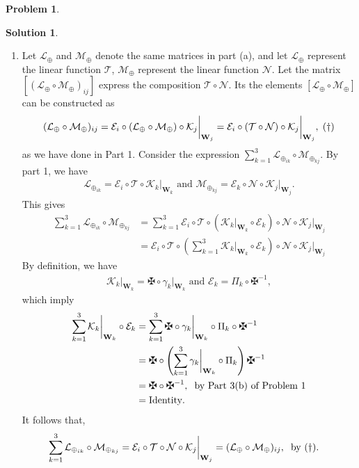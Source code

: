 \documentclass{article}
\theoremstyle{definition}
\newtheorem*{prob*}{Problem}
\newtheorem*{sln*}{Solution}
\newcommand{\W}{\mathbf{W}}
\newcommand{\lag}{\mathcal{L}}
\newcommand{\M}{\mathcal{M}}
\newcommand{\K}{\mathcal{K}}
\newcommand{\N}{\mathcal{N}}
\newcommand{\E}{\mathcal{E}}
\newcommand{\T}{\mathcal{T}}
\begin{document}
\begin{prob*}
\begin{sln*}
\begin{enumerate}
\begin{enumerate}
				
				\item Let $\lag_\oplus$ and $\M_\oplus$ denote the same matrices in part (a), and let $\lag_\oplus$ represent the linear function $\T$, $\M_\oplus$ represent the linear function $\N$. Let the matrix $[(\lag_\oplus\circ\M_\oplus)_{ij}] $ express the composition $\T\circ\N$. Its the elements $[\lag_\oplus\circ\M_\oplus] $ can be constructed as
				\begin{align*}
				(\lag_\oplus\circ\M_\oplus)_{ij} = \E_i \circ (\lag_\oplus \circ \M_\oplus) \circ \K_j\bigg\vert_{\W_j} = \E_i \circ (\T \circ \N) \circ \K_j\bigg\vert_{\W_j} ,\hspace{0.1cm}(\dagger)
				\end{align*}
				as we have done in Part 1. Consider the expression $\sum^3_{k=1}\lag_{\oplus_{ik}}\circ\M_{\oplus_{kj}}$. By part 1, we have
				\begin{align*}
				\lag_{\oplus_{ik}} = \E_i \circ \T \circ \K_k\bigg\vert_{\W_k}\text{ and }\M_{\oplus_{kj}} = \E_k \circ \N \circ \K_j\bigg\vert_{\W_j}.
				\end{align*} 
				This gives
				\begin{align*}
				\sum^3_{k=1}\lag_{\oplus_{ik}}\circ\M_{\oplus_{kj}}
				&= \sum^3_{k=1} \E_i \circ \T \circ \left(\K_k\bigg\vert_{\W_k}\circ \E_k \right)\circ \N \circ \K_j\bigg\vert_{\W_j}\\
				&= \E_i \circ \T \circ \left(\sum^3_{k=1}\K_k\bigg\vert_{\W_k}\circ \E_k\right)  \circ \N \circ \K_j\bigg\vert_{\W_j}
				\end{align*}
				By definition, we have
				\begin{align*}
				\K_k\bigg\vert_{\W_k} = \maltese\circ \gamma_k\bigg\vert_{\W_k}\text{ and }\E_k= \Pi_k\circ\maltese^{-1},
				\end{align*}
				which imply
				\begin{align*}
				\sum^3_{k=1}\K_k\bigg\vert_{\W_k}\circ \E_k &= \sum^3_{k=1} \maltese\circ \gamma_k\bigg\vert_{\W_k}\circ \Pi_k\circ\maltese^{-1}\\
				&= \maltese \circ \left(\sum^3_{k=1} \gamma_k\bigg\vert_{\W_k}\circ \Pi_k \right)\maltese^{-1}\\
				&= \maltese\circ\maltese^{-1},\hspace{0.2cm}\text{by Part 3(b) of Problem 1}\\
				&= \text{Identity}.
				\end{align*}
				It follows that,
				\begin{align*}
					\sum^3_{k=1}\lag_{\oplus_{ik}}\circ\M_{\oplus_{kj}} &= \E_i \circ \T\circ\N\circ\K_j\bigg\vert_{\W_j}= (\lag_\oplus\circ\M_\oplus)_{ij},\hspace{0.2cm}\text{by $(\dagger)$}.

\end{align*}
\end{enumerate}
\end{enumerate}
\end{sln*}
\end{prob*}
\end{document}
